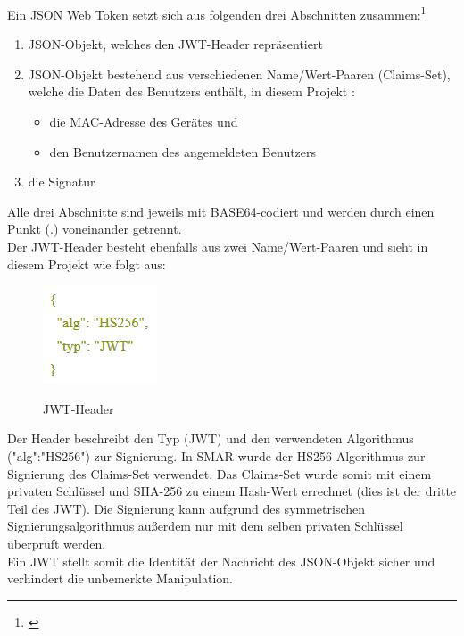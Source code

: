 Ein \ac{JSON} Web Token setzt sich aus folgenden drei Abschnitten zusammen:\footnote{\citep[S. 289f.]{book_jwt}}
\begin{enumerate}
	\item \acs{JSON}-Objekt, welches den \acs{JWT}-Header repräsentiert
	\item \acs{JSON}-Objekt bestehend aus verschiedenen Name/Wert-Paaren (Claims-Set), welche die Daten des Benutzers enthält, in diesem Projekt \zB:
	\begin{itemize}
		\item die \acs{MAC}-Adresse des Gerätes und
		\item den Benutzernamen des angemeldeten Benutzers
	\end{itemize}
	\item die Signatur
\end{enumerate}
Alle drei Abschnitte sind jeweils mit BASE64-codiert und werden durch einen Punkt (.) voneinander getrennt.\\

Der \acs{JWT}-Header besteht ebenfalls aus zwei Name/Wert-Paaren und sieht in diesem Projekt wie folgt aus:
\begin{figure}[H]
	\centering
	{\includegraphics[scale=1.0]{Bilder/jwt_header.jpg}}
	\caption{\acs{JWT}-Header}
	\label{fig:jwt_header}
\end{figure}
Der Header beschreibt den Typ (\acs{JWT}) und den verwendeten Algorithmus  ("alg":"HS256")  zur Signierung. In \ac{SMAR} wurde der HS256-Algorithmus zur Signierung des Claims-Set verwendet. Das Claims-Set wurde somit mit einem privaten Schlüssel und SHA-256 zu einem Hash-Wert errechnet (dies ist der dritte Teil des \acs{JWT}). Die Signierung kann aufgrund des symmetrischen Signierungsalgorithmus außerdem nur mit dem selben privaten Schlüssel überprüft werden.\\
Ein \acl{JWT} stellt somit die Identität der Nachricht \bzw des \acs{JSON}-Objekt sicher und verhindert die unbemerkte Manipulation.\\

